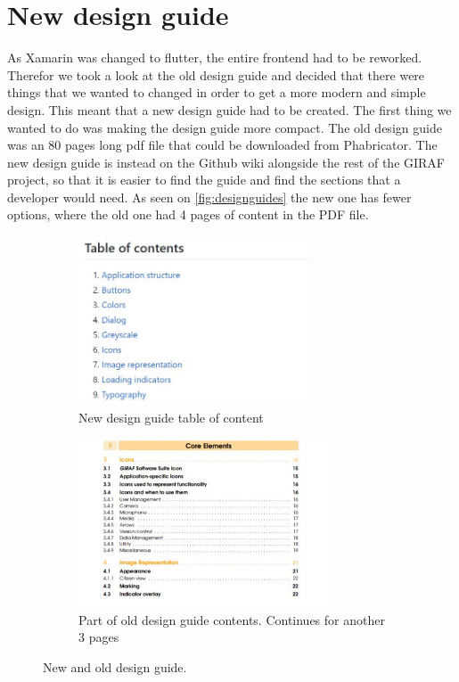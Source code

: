 \section{New design guide}
As Xamarin was changed to flutter, the entire frontend had to be reworked. 
Therefor we took a look at the old design guide and decided that there were things that we wanted to changed in order to get a more modern and simple design.
This meant that a new design guide had to be created.
The first thing we wanted to do was making the design guide more compact.
The old design guide was an 80 pages long pdf file that could be downloaded from Phabricator.
The new design guide is instead on the Github wiki alongside the rest of the GIRAF project, so that it is easier to find the guide and find the sections that a developer would need.
As seen on \autoref{fig:designguides} the new one has fewer options, where the old one had 4 pages of content in the PDF file.
\begin{figure}[H]
    \begin{subfigure}{0.6\textwidth}
    \includegraphics[width=1\linewidth, height=5cm]{figures/table-of-content-designguide.JPG}
    \caption{New design guide table of content}
    \label{fig:new-designguide}
    \end{subfigure}
    \begin{subfigure}{0.6\textwidth}
        \includegraphics[width=1\linewidth, height=5cm]{figures/old-design-guide}
    \caption{Part of old design guide contents. Continues for another 3 pages}
    \label{fig:old-designguide}
    \end{subfigure} 
    \caption{New and old design guide.}
    \label{fig:designguides}
\end{figure} 

